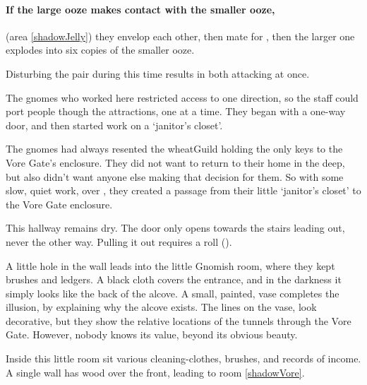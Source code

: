 \begin{multicols}{2}
\paragraph{If the large ooze makes contact with the smaller ooze,}
(area \vref{shadowJelly})
they envelop each other, then mate for , then the larger one explodes into six copies of the smaller ooze.

Disturbing the pair during this time results in  both attacking at once.


\begin{exampletext}
  The gnomes who worked here restricted access to one direction, so the staff could port people though the attractions, one at a time.
  They began with a one-way door, and then started work on a `janitor's closet'.

  The gnomes had always resented the \gls{wheatGuild} holding the only keys to the Vore Gate's enclosure.
  They did not want to return to their home in the \gls{deep}, but also didn't want anyone else making that decision for them.
  So with some slow, quiet work, over , they created a passage from their little `janitor's closet' to the Vore Gate enclosure.
\end{exampletext}

This hallway remains dry.
The door only opens towards the stairs leading out, never the other way.
Pulling it out requires a  roll (\tn[11]).

A little hole in the wall leads into the little Gnomish room, where they kept brushes and ledgers.
A black cloth covers the entrance, and in the darkness it simply looks like the back of the alcove.
A small, painted, vase completes the illusion, by explaining why the alcove exists.
The lines on the vase, look decorative, but they show the relative locations of the tunnels through the Vore Gate.
However, nobody knows its value, beyond its obvious beauty.


Inside this little room sit various cleaning-clothes, brushes, and records of income.
A single wall has wood over the front, leading to room \vref{shadowVore}.




\end{multicols}
